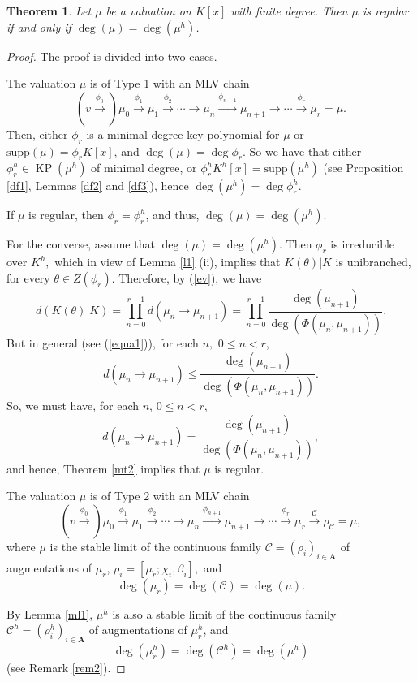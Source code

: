 \documentclass[11pt]{amsart}
\newtheorem{theorem}{Theorem}[section]
\theoremstyle{definition}
\theoremstyle{remark}
\numberwithin{equation}{section}
\begin{document}
		\begin{theorem}\label{lst}
		Let $\mu$ be a valuation on $K[x]$ with finite degree. Then $\mu$ is regular if and only if $\deg(\mu)=\deg(\mu^h)$.	
		\end{theorem}
		\begin{proof}
			The proof is divided into two cases.
			
			\smallskip
			 The valuation $\mu$ is of Type 1 with an MLV chain \[(v\xrightarrow{\phi_0})\mu_0\xrightarrow{\phi_1}\mu_1\xrightarrow{\phi_2}\cdots \longrightarrow \mu_{n}\xrightarrow{\phi_{n+1}} \mu_{n+1}\longrightarrow\cdots\xrightarrow{\phi_r} \mu_r=\mu.\] Then, either $\phi_r$ is a minimal degree key polynomial for $\mu$ or $\text{supp}(\mu)=\phi_r K[x]$, and $\deg(\mu)=\deg\phi_r$. So  we have that either $\phi_r^h \in \operatorname{KP}(\mu^h)$ of minimal degree, or $\phi_r^h K^h[x]=\text{supp}(\mu^h)$ (see Proposition \ref{df1}, Lemmas \ref{df2} and \ref{df3}), hence $\deg (\mu^h)=\deg\phi_r^h.$ 
		
		If $\mu$ is regular, then $\phi_r=\phi_r^h$, and thus, $\deg(\mu)=\deg(\mu^h).$
		
		 For the converse, assume that $\deg(\mu)=\deg(\mu^h).$ Then $\phi_r$ is irreducible over $K^h,$ which in view of Lemma \ref{l1} (ii), implies that $K(\theta)|K$ is unibranched, for every $\theta\in Z(\phi_r).$ Therefore, by (\ref{ev}), we have 
		 \[d(K(\theta)|K)=\prod_{n=0}^{r-1} d(\mu_n\longrightarrow \mu_{n+1})=\prod_{n=0}^{r-1}\frac{\deg(\mu_{n+1})}{\deg(\Phi(\mu_n,\mu_{n+1}))}.\]But in general (see (\ref{equa1})), for each $n,$  $0\leq n<r$,
		 \[d(\mu_n\longrightarrow \mu_{n+1})\leq \frac{\deg(\mu_{n+1})}{\deg(\Phi(\mu_n,\mu_{n+1}))}.\] So, we must have, for each $n$, $0\leq n<r$, \[d(\mu_n\longrightarrow \mu_{n+1})= \frac{\deg(\mu_{n+1})}{\deg(\Phi(\mu_n,\mu_{n+1}))},\]and hence, Theorem \ref{mt2} implies that $\mu$ is regular.
		 
		 \smallskip
		  The valuation $\mu$ is of Type 2 with an MLV chain \[(v\xrightarrow{\phi_0})\mu_0\xrightarrow{\phi_1}\mu_1\xrightarrow{\phi_2}\cdots \longrightarrow \mu_{n}\xrightarrow{\phi_{n+1}} \mu_{n+1}\longrightarrow\cdots\xrightarrow{\phi_r} \mu_r\xrightarrow{\mathcal{C}} \rho_{\mathcal{C}}=\mu,\]  where $\mu$ is the stable limit of the continuous family $\mathcal{C}=(\rho_i)_{i\in\mathbf{A}}$ of augmentations of $\mu_r$, $\rho_i=[\mu_r;\chi_i,\beta_i],$ and \[\deg(\mu_r)=\deg(\mathcal{C})=\deg(\mu).\]
		 
		 By Lemma \ref{ml1}, $\mu^h$ is also a stable limit of the continuous family $\mathcal{C}^h=(\rho_i^h)_{i\in\mathbf{A}}$ of augmentations of $\mu_r^h$, and \[\deg(\mu_r^h)=\deg(\mathcal{C}^h)=\deg(\mu^h)\] (see Remark \ref{rem2}). 
		 

\end{proof}
\end{document}
